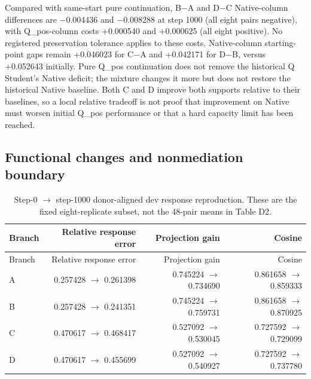 Compared with same-start pure continuation, B\(-\)A and D\(-\)C Native-column differences are \(-\)0.004436 and \(-\)0.008288 at step 1000 (all eight pairs negative), with Q\_pos-column costs +0.000540 and +0.000625 (all eight positive). No registered preservation tolerance applies to these costs. Native-column starting-point gaps remain +0.046023 for C\(-\)A and +0.042171 for D\(-\)B, versus +0.052643 initially. Pure Q\_pos continuation does not remove the historical Q Student's Native deficit; the mixture changes it more but does not restore the historical Native baseline. Both C and D improve both supports relative to their baselines, so a local relative tradeoff is not proof that improvement on Native must worsen initial Q\_pos performance or that a hard capacity limit has been reached.

\subsection{Functional changes and nonmediation boundary}\label{functional-changes-and-nonmediation-boundary}

\begin{longtable}[]{@{}lrrr@{}}
\caption{Step-0 \(\rightarrow\) step-1000 donor-aligned dev response reproduction. These are the fixed eight-replicate subset, not the 48-pair means in Table D2.}\label{tbl:E3}\tabularnewline
\toprule\noalign{}
Branch & Relative response error & Projection gain & Cosine \\
\midrule\noalign{}
\endfirsthead
\toprule\noalign{}
Branch & Relative response error & Projection gain & Cosine \\
\midrule\noalign{}
\endhead
\bottomrule\noalign{}
\endlastfoot
A & 0.257428 \(\rightarrow\) 0.261398 & 0.745224 \(\rightarrow\) 0.734690 & 0.861658 \(\rightarrow\) 0.859333 \\
B & 0.257428 \(\rightarrow\) 0.241351 & 0.745224 \(\rightarrow\) 0.759731 & 0.861658 \(\rightarrow\) 0.870925 \\
C & 0.470617 \(\rightarrow\) 0.468417 & 0.527092 \(\rightarrow\) 0.530045 & 0.727592 \(\rightarrow\) 0.729099 \\
D & 0.470617 \(\rightarrow\) 0.455699 & 0.527092 \(\rightarrow\) 0.540927 & 0.727592 \(\rightarrow\) 0.737780 \\
\end{longtable}

